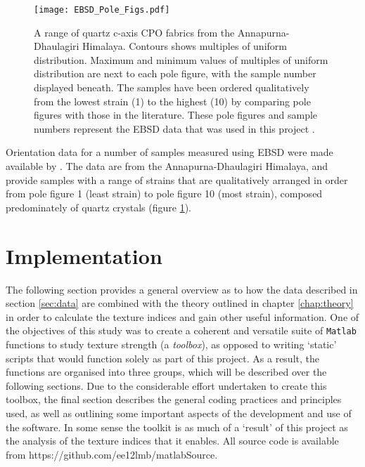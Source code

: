 \documentclass[a4paper,12pt,twoside]{report}
\numberwithin{equation}{chapter}
\begin{document}
\begin{figure}[h!]
  \centering
    \texttt{[image: EBSD\_Pole\_Figs.pdf]}
  \caption[EBSD data (pole figures)]{A range of quartz c-axis CPO fabrics from the Annapurna-Dhaulagiri Himalaya. Contours shows multiples of uniform distribution. Maximum and minimum values of multiples of uniform distribution are next to each pole figure, with the sample number displayed beneath. The samples have been ordered qualitatively from the lowest strain (1) to the highest (10) by comparing pole figures with those in the literature. These pole figures and sample numbers represent the EBSD data that was used in this project \citep[made available from][]{ParsonsThesis}.}
  \label{fig:EBSD_data}
\end{figure}  
    

Orientation data for a number of samples measured using EBSD were made available by \cite{ParsonsThesis}. The data are from the Annapurna-Dhaulagiri Himalaya, and provide samples with a range of strains that are qualitatively arranged in order from pole figure 1 (least strain) to pole figure 10 (most strain), composed predominately of quartz crystals (figure \ref{fig:EBSD_data}). 



\section{Implementation}

The following section provides a general overview as to how the data described in section \ref{sec:data} are combined with the theory outlined in chapter \ref{chap:theory} in order to calculate the texture indices and gain other useful information. One of the objectives of this study was to create a coherent and versatile suite of \texttt{Matlab} functions to study texture strength (a \emph{toolbox}), as opposed to writing \lq{}static\rq{} scripts that would function solely as part of this project. As a result, the functions are organised into three groups, which will be described over the following sections. Due to the considerable effort undertaken to create this toolbox, the final section describes the general coding practices and principles used, as well as outlining some important aspects of the development and use of the software. In some sense the toolkit is as much of a \lq{}result\rq{} of this project as the analysis of the texture indices that it enables. All source code is available from https://github.com/ee12lmb/matlabSource.                                                                                                     
\end{document}
